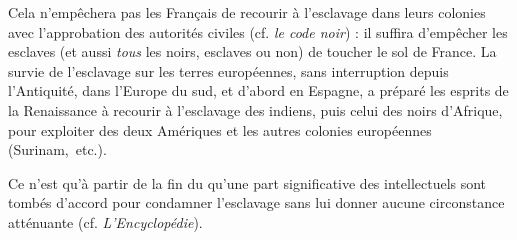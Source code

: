  Cela n'empêchera pas les Français de recourir à l'esclavage dans leurs colonies avec l'approbation des autorités civiles (cf. \emph{le code noir}) : il suffira d'empêcher les esclaves (et aussi \emph{tous} les noirs, esclaves ou non) de toucher le sol de France. La survie de l'esclavage sur les terres européennes, sans interruption depuis l'Antiquité, dans l'Europe du sud, et d'abord en Espagne, a préparé les esprits de la Renaissance à recourir  à l'esclavage des indiens, puis celui des noirs d'Afrique, pour exploiter des deux Amériques et les autres colonies européennes (Surinam,~etc.). 

 Ce n'est qu'à partir de la fin du  qu'une part significative des intellectuels sont tombés d'accord pour condamner l'esclavage sans lui donner aucune circonstance atténuante (cf. \emph{L'Encyclopédie}).
 



